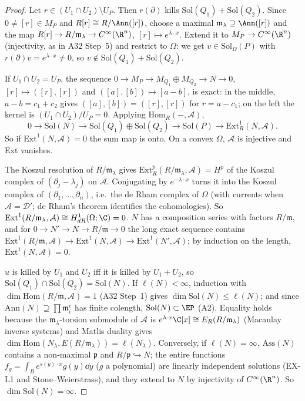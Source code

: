 \begin{proof}
Let $r\in(U_1\cap U_2)\setminus U_P$. Then $r(\partial)$ kills $\mathrm{Sol}(Q_1)+\mathrm{Sol}(Q_2)$. Since $0\ne[r]\in M_P$ and $R[r]\cong R/\Ann([r])$, choose a maximal $\mathfrak m_\lambda\supseteq\Ann([r])$ and the map $R[r]\to R/\mathfrak m_\lambda\to C^\infty(\R^n)$, $[r]\mapsto e^{\lambda\cdot x}$. Extend it to $M_P\to C^\infty(\R^n)$ (injectivity, as in A32 Step~5) and restrict to $\Omega$: we get $v\in\mathrm{Sol}_\Omega(P)$ with $r(\partial)v=e^{\lambda\cdot x}\ne0$, so $v\notin\mathrm{Sol}(Q_1)+\mathrm{Sol}(Q_2)$.

If $U_1\cap U_2=U_P$, the sequence $0\to M_P\to M_{Q_1}\oplus M_{Q_2}\to N\to0$, $[r]\mapsto([r],[r])$ and $([a],[b])\mapsto[a-b]$, is exact: in the middle, $a-b=c_1+c_2$ gives $([a],[b])=([r],[r])$ for $r=a-c_1$; on the left the kernel is $(U_1\cap U_2)/U_P=0$. Applying $\mathrm{Hom}_R(-,\mathcal A)$,
\[
0\to\mathrm{Sol}(N)\to\mathrm{Sol}(Q_1)\oplus\mathrm{Sol}(Q_2)\to\mathrm{Sol}(P)\to\mathrm{Ext}^1_R(N,\mathcal A).
\]
So if $\mathrm{Ext}^1(N,\mathcal A)=0$ the sum map is onto. On a convex $\Omega$, $\mathcal A$ is injective and Ext vanishes.

The Koszul resolution of $R/\mathfrak m_\lambda$ gives $\mathrm{Ext}^p_R(R/\mathfrak m_\lambda,\mathcal A)=H^p$ of the Koszul complex of $(\partial_j-\lambda_j)$ on $\mathcal A$. Conjugating by $e^{-\lambda\cdot x}$ turns it into the Koszul complex of $(\partial_1,\dots,\partial_n)$, i.e.\ the de Rham complex of $\Omega$ (with currents when $\mathcal A=\mathcal D'$; de Rham's theorem identifies the cohomologies). So $\mathrm{Ext}^1(R/\mathfrak m_\lambda,\mathcal A)\cong H^1_{dR}(\Omega;\C)=0$. $N$ has a composition series with factors $R/\mathfrak m$, and for $0\to N'\to N\to R/\mathfrak m\to0$ the long exact sequence contains $\mathrm{Ext}^1(R/\mathfrak m,\mathcal A)\to\mathrm{Ext}^1(N,\mathcal A)\to\mathrm{Ext}^1(N',\mathcal A)$; by induction on the length, $\mathrm{Ext}^1(N,\mathcal A)=0$.

$u$ is killed by $U_1$ and $U_2$ iff it is killed by $U_1+U_2$, so $\mathrm{Sol}(Q_1)\cap\mathrm{Sol}(Q_2)=\mathrm{Sol}(N)$. If $\ell(N)<\infty$, induction with $\dim\mathrm{Hom}(R/\mathfrak m,\mathcal A)=1$ (A32 Step~1) gives $\dim\mathrm{Sol}(N)\le\ell(N)$; and since $\mathrm{Ann}(N)\supseteq\prod\mathfrak m_i^e$ has finite colength, $\mathrm{Sol}(N)\subset\EP$ (A2). Equality holds because the $\mathfrak m_\lambda$-torsion submodule of $\mathcal A$ is $e^{\lambda\cdot x}\C[x]\cong E_R(R/\mathfrak m_\lambda)$ (Macaulay inverse systems) and Matlis duality gives $\dim\mathrm{Hom}(N_\lambda,E(R/\mathfrak m_\lambda))=\ell(N_\lambda)$. Conversely, if $\ell(N)=\infty$, $\mathrm{Ass}(N)$ contains a non-maximal $\mathfrak p$ and $R/\mathfrak p\hookrightarrow N$; the entire functions $f_g=\int_Be^{s(y)\cdot x}g(y)\dd y$ ($g$ a polynomial) are linearly independent solutions (EX-L1 and Stone--Weierstrass), and they extend to $N$ by injectivity of $C^\infty(\R^n)$. So $\dim\mathrm{Sol}(N)=\infty$.


\end{proof}
